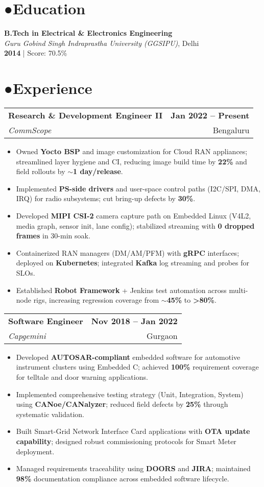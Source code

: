 \documentclass[11pt,a4paper]{article}
\makeatletter
\newcommand{\faGraduationCap}{●}
\newcommand{\faBriefcase}{●}
\newcommand{\ressection}[2]{\section*{#2\hspace{0.5em}#1}}
\newcommand{\ressubsection}[4]{
    \vspace{6pt}
    {\renewcommand{\arraystretch}{1.1}
    \begin{tabular*}{\textwidth}{@{}l@{\extracolsep{\fill}}r@{}}
        {\large\textbf{#1}} & {\color{darkGrey}\textbf{#2}} \\
        {\color{accentcolor}\textit{#3}} & {\color{darkGrey}#4} \\
    \end{tabular*}}
    \vspace{3pt}
}
\makeatother
\begin{document}
\ressection{Education}{\faGraduationCap}
{\color{textcolor}
\textbf{\large B.Tech in Electrical \& Electronics Engineering}\\
\textcolor{accentcolor}{\textit{Guru Gobind Singh Indraprastha University (GGSIPU)}}, Delhi\\
\textbf{2014} | Score: 70.5\%
}

\ressection{Experience}{\faBriefcase}

\ressubsection{Research \& Development Engineer II}{Jan 2022 -- Present}{CommScope}{Bengaluru}
{\color{textcolor}
\begin{itemize}[leftmargin=15pt,topsep=2pt,itemsep=2pt,parsep=0pt]
\item Owned \textbf{Yocto BSP} and image customization for Cloud RAN appliances; streamlined layer hygiene and CI, reducing image build time by \textbf{22\%} and field rollouts by \textbf{$\sim$1 day/release}.
\item Implemented \textbf{PS-side drivers} and user-space control paths (I2C/SPI, DMA, IRQ) for radio subsystems; cut bring-up defects by \textbf{30\%}.
\item Developed \textbf{MIPI CSI-2} camera capture path on Embedded Linux (V4L2, media graph, sensor init, lane config); stabilized streaming with \textbf{0 dropped frames} in 30-min soak.
\item Containerized RAN managers (DM/AM/PFM) with \textbf{gRPC} interfaces; deployed on \textbf{Kubernetes}; integrated \textbf{Kafka} log streaming and probes for SLOs.
\item Established \textbf{Robot Framework} + Jenkins test automation across multi-node rigs, increasing regression coverage from \textbf{$\sim$45\%} to \textbf{>80\%}.
\end{itemize}
}

\ressubsection{Software Engineer}{Nov 2018 -- Jan 2022}{Capgemini}{Gurgaon}
{\color{textcolor}
\begin{itemize}[leftmargin=15pt,topsep=2pt,itemsep=2pt,parsep=0pt]
\item Developed \textbf{AUTOSAR-compliant} embedded software for automotive instrument clusters using Embedded C; achieved \textbf{100\%} requirement coverage for telltale and door warning applications.
\item Implemented comprehensive testing strategy (Unit, Integration, System) using \textbf{CANoe/CANalyzer}; reduced field defects by \textbf{25\%} through systematic validation.
\item Built Smart-Grid Network Interface Card applications with \textbf{OTA update capability}; designed robust commissioning protocols for Smart Meter deployment.
\item Managed requirements traceability using \textbf{DOORS} and \textbf{JIRA}; maintained \textbf{98\%} documentation compliance across embedded software lifecycle.
\end{itemize}
}
\end{document}
